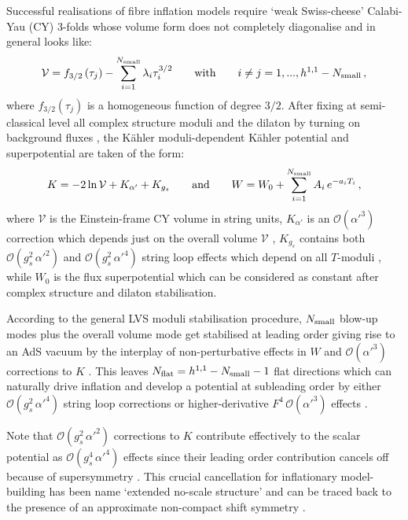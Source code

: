 \documentclass[11pt,a4paper]{article}
\newcommand{\be}{\begin{equation}}
\newcommand{\ee}{\end{equation}}
\newcommand\vo{{\mathcal{V}}}
\newcommand{\mc}{\mathcal}
\begin{document}
Successful realisations of fibre inflation models require `weak Swiss-cheese' Calabi-Yau (CY) 3-folds whose volume form does not completely diagonalise and in general looks like:
\be
\vo = f_{3/2}\left(\tau_j\right) - \sum_{i=1}^{N_{\rm small}} \lambda_i \tau_i^{3/2}\qquad\text{with}\qquad i\neq j=1,...,h^{1,1} - N_{\rm small}\,,
\label{WSC}
\ee
where $f_{3/2}\left(\tau_j\right)$ is a homogeneous function of degree $3/2$. After fixing at semi-classical level all complex structure moduli and the dilaton by turning on background fluxes \cite{Giddings:2001yu}, the K\"ahler moduli-dependent K\"ahler potential and superpotential are taken of the form:
\be
K = -2\ln \vo + K_{\alpha'} + K_{g_s} \qquad \text{and} \qquad W = W_0 + \sum_{i=1}^{N_{\rm small}} A_i\,e^{-a_i T_i}\,,
\ee
where $\vo$ is the Einstein-frame CY volume in string units, $K_{\alpha'}$ is an $\mc{O}(\alpha'^3)$ correction which depends just on the overall volume $\vo$ \cite{Becker:2002nn, Minasian:2015bxa, Bonetti:2016dqh}, $K_{g_s}$ contains both $\mc{O}(g_s^2 \,\alpha'^2)$ and $\mc{O}(g_s^2 \,\alpha'^4)$ string loop effects which depend on all $T$-moduli \cite{Berg:2005ja, Berg:2007wt, Cicoli:2007xp}, while $W_0$ is the flux superpotential which can be considered as constant after complex structure and dilaton stabilisation. 

According to the general LVS moduli stabilisation procedure, $N_{\rm small}$ blow-up modes plus the overall volume mode get stabilised at leading order giving rise to an AdS vacuum by the interplay of non-perturbative effects in $W$ and $\mc{O}(\alpha'^3)$ corrections to $K$ \cite{Cicoli:2008va}. This leaves $N_{\rm flat} = h^{1,1} - N_{\rm small} - 1$ flat directions which can naturally drive inflation and develop a potential at subleading order by either $\mc{O}(g_s^2 \,\alpha'^4)$ string loop corrections \cite{Berg:2005ja, Berg:2007wt, Cicoli:2007xp} or higher-derivative $F^4\,\mc{O}(\alpha'^3)$ effects \cite{Cicoli:2016chb}.

Note that $\mc{O}(g_s^2 \,\alpha'^2)$ corrections to $K$ contribute effectively to the scalar potential as $\mc{O}(g_s^4 \,\alpha'^4)$ effects since their leading order contribution cancels off because of supersymmetry \cite{Cicoli:2007xp}. This crucial cancellation for inflationary model-building has been name `extended no-scale structure' and can be traced back to the presence of an approximate non-compact shift symmetry \cite{Burgess:2014tja}.
\end{document}
